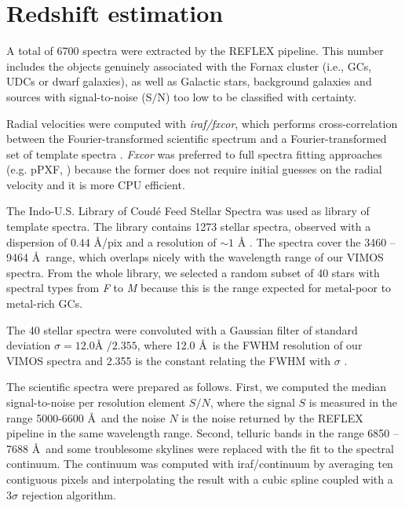 \documentclass[useAMS,usenatbib]{mn2e}
\begin{document}
\section{Redshift estimation}
\label{sec:zest}

A total of 6700 spectra were extracted by the REFLEX pipeline. This number 
includes the objects genuinely associated with the Fornax cluster (i.e., GCs, 
UDCs or dwarf galaxies), as well as Galactic stars, background galaxies and 
sources with signal-to-noise (S$/$N) too low to be classified with certainty. 

Radial velocities were computed with {\it iraf/fxcor}, which performs 
cross-correlation between the Fourier-transformed scientific spectrum and a 
Fourier-transformed set of template spectra \citep{Tonry79}. {\it Fxcor} was 
preferred to full spectra fitting approaches (e.g. pPXF, 
\citealt{Cappellari04}) because the former does not require initial guesses on 
the radial velocity and it is more CPU efficient. 

The Indo-U.S. Library of Coud\'e Feed Stellar Spectra \citep{Valdes04} was used 
as library of template spectra. The library contains 1273 stellar spectra, 
observed with a dispersion of $0.44$ \AA /pix and a resolution of $\sim 1$ \AA 
. The spectra cover the 3460 -- 9464 \AA\ range, which overlaps nicely with the 
wavelength range of our VIMOS spectra. From the whole library, we selected a 
random subset of 40 stars with spectral types from \textit{F} to \textit{M} 
because this is the range expected for metal-poor to metal-rich GCs. 

The 40 stellar spectra were convoluted with a Gaussian filter of standard 
deviation $\sigma = 12.0\mbox{\AA\ } / 2.355$, where 12.0 \AA\ is the FWHM 
resolution of our VIMOS spectra and 2.355 is the constant relating the FWHM with $\sigma$ . 

The scientific spectra were prepared as follows. First, we computed the median 
signal-to-noise per resolution element $S/N$, where the signal $S$ is measured in the range 
5000-6600 \AA\ and the noise $N$ is the noise returned by the REFLEX pipeline 
in the same wavelength range. Second, telluric bands in the range 6850 -- 7688 
\AA\ and some troublesome skylines were replaced with the fit to the spectral 
continuum. The continuum was computed with iraf/continuum by averaging ten 
contiguous pixels and interpolating the result with a cubic spline coupled with 
a $3\sigma$ rejection algorithm.  
\end{document}
